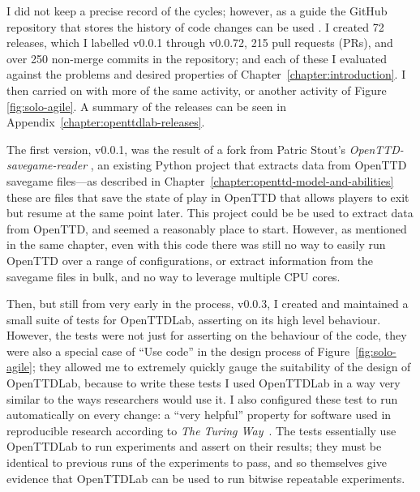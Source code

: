 \documentclass[logo,msc,dsti]{style/infthesis}    %
\begin{document}
{I did not keep a precise record of the cycles; however, as a guide the GitHub repository that stores the history of code changes can be used \cite{OpenTTDLab}. I created 72 releases, which I labelled v0.0.1 through v0.0.72, 215 pull requests (PRs), and over 250 non-merge commits in the repository; and each of these I evaluated against the problems and desired properties of Chapter~\ref{chapter:introduction}. I then carried on with more of the same activity, or another activity of Figure \ref{fig:solo-agile}. A summary of the releases can be seen in Appendix~\ref{chapter:openttdlab-releases}.

The first version, v0.0.1, was the result of a fork from Patric Stout's \emph{OpenTTD-savegame-reader} \cite{Stout2024}, an existing Python project that extracts data from OpenTTD savegame files---as described in Chapter~\ref{chapter:openttd-model-and-abilities} these are files that save the state of play in OpenTTD that allows players to exit but resume at the same point later. This project could be be used to extract data from OpenTTD, and seemed a reasonably place to start. However, as mentioned in the same chapter, even with this code there was still no way to easily run OpenTTD over a range of configurations, or extract information from the savegame files in bulk, and no way to leverage multiple CPU cores.

Then, but still from very early in the process, v0.0.3, I created and maintained a small suite of tests for OpenTTDLab, asserting on its high level behaviour. However, the tests were not just for asserting on the behaviour of the code, they were also a special case of ``Use code'' in the design process of Figure~\ref{fig:solo-agile}; they allowed me to extremely quickly gauge the suitability of the design of OpenTTDLab, because to write these tests I used OpenTTDLab in a way very similar to the ways researchers would use it. I also configured these test to run automatically on every change: a ``very helpful'' property for software used in reproducible research according to \emph{The Turing Way}~\cite{turingway2022}. The tests essentially use OpenTTDLab to run experiments and assert on their results; they must be identical to previous runs of the experiments to pass, and so themselves give evidence that OpenTTDLab can be used to run bitwise repeatable experiments.

}
\end{document}
